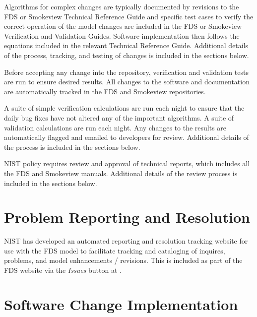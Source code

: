 \documentclass[11pt]{book}
\begin{document}
\begin{description}
\begin{description}
\end{description}
\item [2. Analyze, evaluate, and implement the change:] Algorithms for complex changes are typically documented by revisions to the FDS or Smokeview Technical Reference Guide and specific test cases to verify the correct operation of the model changes are included in the FDS or Smokeview Verification and Validation Guides. Software implementation then follows the equations included in the relevant Technical Reference Guide. Additional details of the process, tracking, and testing of changes is included in the sections below.
\item [3. Review and approval of the change:] Before accepting any change into the repository, verification and validation tests are run to ensure desired results. All changes to the software and documentation are automatically tracked in the FDS and Smokeview repositories.
\item [4. Verification and Validation:] A suite of simple verification calculations are run each night to ensure that the daily bug fixes have not altered any of the important algorithms. A suite of validation calculations are run each night. Any changes to the results are automatically flagged and emailed to developers for review. Additional details of the process is included in the sections below.
\item [5. Release of new versions:] NIST policy requires review and approval of technical reports, which includes all the FDS and Smokeview manuals. Additional details of the review process is included in the sections below.
\end{description}

\section{Problem Reporting and Resolution}

NIST has developed an automated reporting and resolution tracking website for use with the FDS model to facilitate tracking and cataloging of inquires, problems, and model enhancements / revisions. This is included as part of the FDS website via the \emph{Issues} button at \href{https://pages.nist.gov/fds-smv} {}.

\section{Software Change Implementation}
\end{document}
